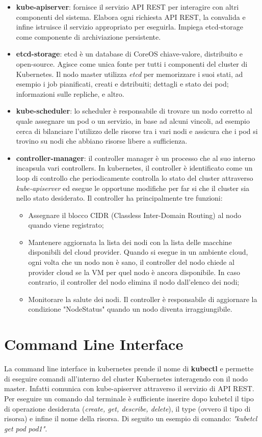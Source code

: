 \documentclass[12pt, a4paper]{report}
\begin{document}
\begin{itemize}
  \item \textbf{kube-apiserver}: fornisce il servizio API REST per interagire con altri componenti del sistema. Elabora ogni richiesta API REST, la convalida e infine istruisce il servizio appropriato per eseguirla. Impiega etcd-storage come componente di archiviazione persistente.
  \item \textbf{etcd-storage}: etcd è un database di CoreOS chiave-valore, distribuito e open-source. Agisce come unica fonte per tutti i componenti del cluster di Kubernetes. Il nodo master utilizza \textit{etcd} per memorizzare i suoi stati, ad esempio i job pianificati, creati e dstribuiti; dettagli e stato dei pod; informazioni sulle repliche, e altro.
  \item \textbf{kube-scheduler}: lo scheduler è responsabile di trovare un nodo corretto al quale assegnare un pod o un servizio, in base ad alcuni vincoli, ad esempio cerca di bilanciare l'utilizzo delle risorse tra i vari nodi e assicura che i pod si trovino su nodi che abbiano risorse libere a sufficienza.
  \item \textbf{controller-manager}: il controller manager è un processo che al suo interno incapsula vari controllers. In kubernetes, il controller è identificato come un loop di controllo che periodicamente controlla lo stato del cluster attraverso \textit{kube-apiserver} ed esegue le opportune modifiche per far si che il cluster sia nello stato desiderato. Il controller ha principalmente tre funzioni:
  \begin{itemize}
    \item Assegnare il blocco CIDR (Classless Inter-Domain Routing) al nodo quando viene registrato;
    \item Mantenere aggiornata la lista dei nodi con la lista delle macchine disponibili del cloud provider. Quando si esegue in un ambiente cloud, ogni volta che un nodo non è sano, il controller del nodo chiede al provider cloud se la VM per quel nodo è ancora disponibile. In caso contrario, il controller del nodo elimina il nodo dall'elenco dei nodi;
    \item Monitorare la salute dei nodi. Il controller è responsabile di aggiornare la condizione "NodeStatus" quando un nodo diventa irraggiungibile.
  \end{itemize}
\end{itemize}
\section{Command Line Interface}
La command line interface in kubernetes prende il nome di \textbf{kubectl} e permette di eseguire comandi all'interno del cluster Kubernetes interagendo con il nodo master. Infatti comunica con kube-apiserver attraverso il servizio di API REST. Per eseguire un comando dal terminale è sufficiente inserire dopo kubetcl il tipo di operazione desiderata (\textit{create, get, describe, delete}), il type (ovvero il tipo di risorsa) e infine il nome della risorsa. Di seguito un esempio di comando: \textit{"kubetcl get pod pod1"}.
\end{document}

